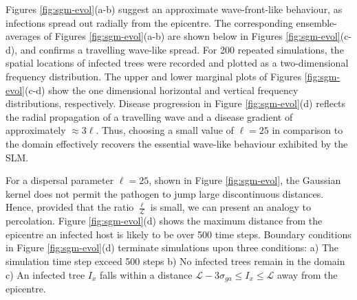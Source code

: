 Figures \ref{fig:sgm-evol}(a-b) suggest an approximate wave-front-like behaviour, as infections spread out radially from the epicentre.
The corresponding ensemble-averages of Figures \ref{fig:sgm-evol}(a-b) are shown below in Figures \ref{fig:sgm-evol}(c-d), and confirms a travelling wave-like spread.
For 200 repeated simulations, the spatial locations of infected trees were recorded and plotted as a two-dimensional frequency distribution.
The upper and lower marginal plots of Figures \ref{fig:sgm-evol}(c-d) show the one dimensional horizontal and vertical frequency distributions, respectively.
Disease progression in Figure \ref{fig:sgm-evol}(d) reflects the radial propagation of a travelling wave and a disease gradient of approximately $\approx 3\ell$.
Thus, choosing a small value of $\ell=25$ in comparison to the domain effectively recovers the essential wave-like behaviour exhibited by the SLM.

For a dispersal parameter $\ell=25$, shown in Figure \ref{fig:sgm-evol}, the Gaussian kernel does not permit the pathogen to jump large discontinuous distances.
Hence, provided that the ratio $\frac{\ell}{\mathcal{L}}$ is small, we can present an analogy to percolation.
Figure \ref{fig:sgm-evol}(d) shows the maximum distance from the epicentre an infected host is likely to be over 500 time steps.
Boundary conditions in Figure \ref{fig:sgm-evol}(d) terminate simulations upon three conditions: 
a) The simulation time step exceed 500 steps 
b) No infected trees remain in the domain 
c) An infected tree $I_{x}$ falls within a distance $\mathcal{L} - 3\sigma_{ga} \leq I_{x} \leq \mathcal{L}$ away from the epicentre.
    

